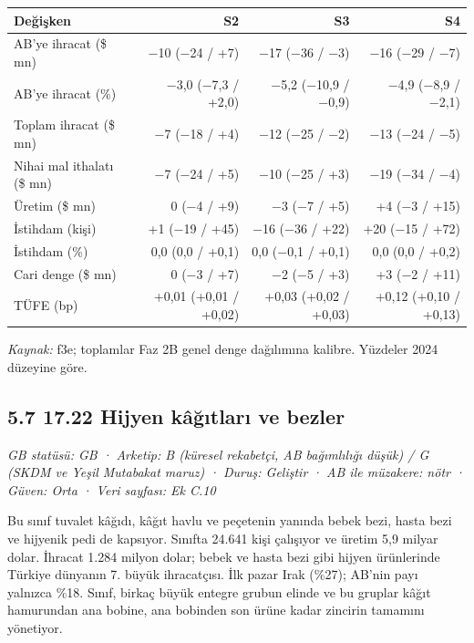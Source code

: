 \begin{longtable}[]{@{}lrrr@{}}
\toprule\noalign{}
\textbf{Değişken} & \textbf{S2} & \textbf{S3} & \textbf{S4} \\
\midrule\noalign{}
\endhead
\bottomrule\noalign{}
\endlastfoot
AB'ye ihracat (\$ mn) & −10 (−24 / +7) & −17 (−36 / −3) & −16 (−29 / −7) \\
AB'ye ihracat (\%) & −3,0 (−7,3 / +2,0) & −5,2 (−10,9 / −0,9) & −4,9 (−8,9 / −2,1) \\
Toplam ihracat (\$ mn) & −7 (−18 / +4) & −12 (−25 / −2) & −13 (−24 / −5) \\
Nihai mal ithalatı (\$ mn) & −7 (−24 / +5) & −10 (−25 / +3) & −19 (−34 / −4) \\
Üretim (\$ mn) & 0 (−4 / +9) & −3 (−7 / +5) & +4 (−3 / +15) \\
İstihdam (kişi) & +1 (−19 / +45) & −16 (−36 / +22) & +20 (−15 / +72) \\
İstihdam (\%) & 0,0 (0,0 / +0,1) & 0,0 (−0,1 / +0,1) & 0,0 (0,0 / +0,2) \\
Cari denge (\$ mn) & 0 (−3 / +7) & −2 (−5 / +3) & +3 (−2 / +11) \\
TÜFE (bp) & +0,01 (+0,01 / +0,02) & +0,03 (+0,02 / +0,03) & +0,12 (+0,10 / +0,13) \\
\end{longtable}

\endgroup

\emph{Kaynak:} \etiketT{} f3e; toplamlar Faz 2B genel denge dağılımına kalibre. Yüzdeler 2024 düzeyine göre.

\hypertarget{nace_kartlar_16-18-57-1722-hijyen-kuxe2ux11fux131tlarux131-ve-bezler}{%
\subsection{5.7 17.22 Hijyen kâğıtları ve bezler}\label{nace_kartlar_16-18-57-1722-hijyen-kuxe2ux11fux131tlarux131-ve-bezler}}

\emph{GB statüsü: GB · Arketip: B (küresel rekabetçi, AB bağımlılığı düşük) / G (SKDM ve Yeşil Mutabakat maruz) · Duruş: Geliştir · AB ile müzakere: nötr · Güven: Orta · Veri sayfası: Ek C.10}

Bu sınıf tuvalet kâğıdı, kâğıt havlu ve peçetenin yanında bebek bezi, hasta bezi ve hijyenik pedi de kapsıyor. Sınıfta 24.641 kişi çalışıyor ve üretim 5,9 milyar dolar. İhracat 1.284 milyon dolar; bebek ve hasta bezi gibi hijyen ürünlerinde Türkiye dünyanın 7. büyük ihracatçısı. İlk pazar Irak (\%27); AB'nin payı yalnızca \%18. Sınıf, birkaç büyük entegre grubun elinde ve bu gruplar kâğıt hamurundan ana bobine, ana bobinden son ürüne kadar zincirin tamamını yönetiyor.

